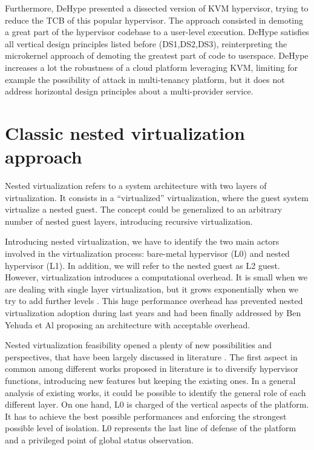 \documentclass{sig-alternate}
\begin{document}
Furthermore, DeHype \cite{wu2013TamHosHypMosDepExe} presented a dissected version of KVM hypervisor, trying to reduce the TCB of this popular hypervisor. The approach consisted in demoting a great part of the hypervisor codebase to a user-level execution. DeHype satisfies all vertical design principles listed before (DS1,DS2,DS3), reinterpreting the microkernel approach of demoting the greatest part of code to userspace. DeHype increases a lot the robustness of a cloud platform leveraging KVM, limiting for example the possibility of attack in multi-tenancy platform, but it does not address horizontal design principles about a multi-provider service.

\section{Classic nested virtualization approach}
\label{sec:classic}

Nested virtualization refers to a system architecture with two layers of virtualization. It consists in a ``virtualized'' virtualization, where the guest system virtualize a nested guest. The concept could be generalized to an arbitrary number of nested guest layers, introducing recursive virtualization.

Introducing nested virtualization, we have to identify the two main actors involved in the virtualization process: bare-metal hypervisor (L0) and nested hypervisor (L1). In addition, we will refer to the nested guest as L2 guest. 
However, virtualization introduces a computational overhead. It is small when we are dealing with single layer virtualization, but it grows exponentially when we try to add further levels \cite{rec:virt}. This huge performance overhead has prevented nested virtualization adoption during last years and had been finally addressed by Ben Yehuda et Al \cite{turtle:ibm} proposing an architecture with acceptable overhead.

Nested virtualization feasibility opened a plenty of new possibilities and perspectives, that have been largely discussed in literature \cite{rec:virt,turtle:ibm,art:blan}. The first aspect in common among different works proposed in literature is to diversify hypervisor functions, introducing new features but keeping the existing ones. In a general analysis of existing works, it could be possible to identify the general role of each different layer.
On one hand, L0 is charged of the vertical aspects of the platform. It has to achieve  the best possible performances and enforcing the strongest possible level of isolation. L0 represents the last line of defense of the platform and a privileged point of global status observation.
\end{document}
